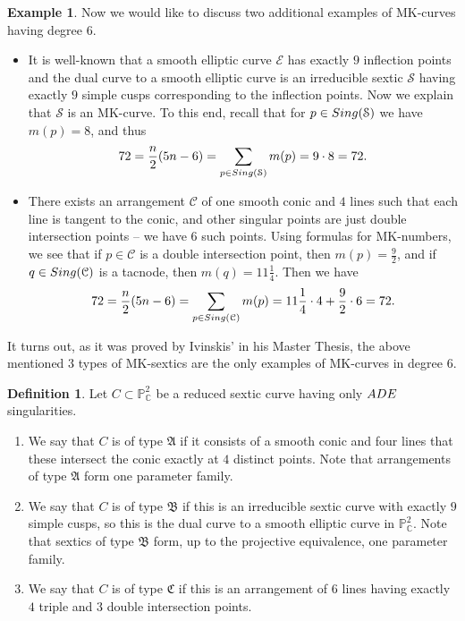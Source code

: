 \documentclass[11pt]{amsart}
\theoremstyle{plain}
\theoremstyle{definition}
\newtheorem{definition}[thm]{Definition}
\newtheorem{example}[thm]{Example}
\numberwithin{equation}{section}
\begin{document}
\begin{example}\label{E1}
Now we would like to discuss two additional examples of MK-curves having degree $6$. 
\begin{itemize}
\item It is well-known that a smooth elliptic curve $\mathcal{E}$ has exactly $9$ inflection points and the dual curve to a smooth elliptic curve is an irreducible sextic $\mathcal{S}$ having exactly $9$ simple cusps corresponding to the inflection points. Now we explain that $\mathcal{S}$ is an MK-curve. To this end, recall that for $p \in {\rm Sing}(\mathcal{S})$ we have $m(p)=8$, and thus
$$72 = \frac{n}{2}(5n-6) = \sum_{p \in {\rm Sing}(\mathcal{S})}m(p) = 9\cdot 8 =72.$$
\item There exists an arrangement $\mathcal{C}$ of one smooth conic and $4$ lines such that each line is tangent to the conic, and other singular points are just double intersection points -- we have $6$ such points. Using formulas for MK-numbers, we see that if $p \in \mathcal{C}$ is a double intersection point, then $m(p)=\frac{9}{2}$, and if $q \in {\rm Sing}(\mathcal{C})$ is a tacnode, then $m(q) = 11\frac{1}{4}$. Then we have
$$72 = \frac{n}{2}(5n-6) = \sum_{p\in {\rm Sing}(\mathcal{C})} m(p) = 11\frac{1}{4}\cdot 4 + \frac{9}{2}\cdot 6 = 72.$$
\end{itemize}

\end{example}
It turns out, as it was proved by Ivinskis' in his Master Thesis, the above mentioned $3$ types of MK-sextics are the only examples of MK-curves in degree $6$. 
\begin{definition}
\label{defI}
Let $C \subset \mathbb{P}^{2}_{\mathbb{C}}$ be a reduced sextic curve having only ${\rm ADE}$ singularities.
\begin{enumerate}
\item[(A)] We say that $C$ is of type $\mathfrak{A}$ if it consists of a smooth conic and four lines that these intersect the conic exactly at $4$ distinct points. Note that arrangements of type $\mathfrak{A}$ form one parameter family. 
\item[(B)] We say that $C$ is of type $\mathfrak{B}$ if this is an irreducible sextic curve with exactly $9$ simple cusps, so this is the dual curve to a smooth elliptic curve in $\mathbb{P}^{2}_{\mathbb{C}}$. Note that sextics of type $\mathfrak{B}$ form, up to the projective equivalence, one parameter family.
\item[(C)] We say that $C$ is of type $\mathfrak{C}$ if this is an arrangement of $6$ lines having exactly $4$ triple and $3$ double intersection points.
\end{enumerate}
\end{definition}
\end{document}
